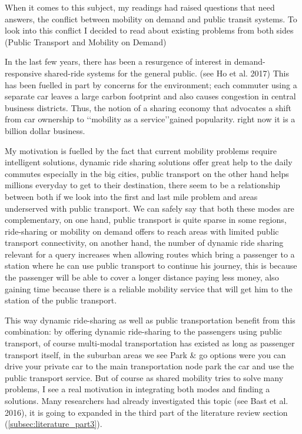 \documentclass{article}
\begin{document}

When it comes to this subject, my readings had raised questions that need answers, the conflict between mobility on demand and public transit systems. To look into this conflict I decided to read about existing problems from both sides (Public Transport and Mobility on Demand)

In the last few years, there has been a resurgence of interest in demand-responsive shared-ride systems for the general public. (see Ho et al. 2017)\cite{HO_darp2018} This has been fuelled in part by concerns for the environment; each commuter using a separate car leaves a large carbon footprint and also causes congestion in central business districts. Thus, the notion of a sharing economy that advocates a shift from car ownership to \lq\lq{mobility as a service}\rq\rq gained popularity. right now it is a billion dollar business. 

My motivation is fuelled by the fact that current mobility problems require intelligent solutions, dynamic ride sharing solutions offer great help to the daily commutes especially in the big cities, public transport on the other hand helps millions everyday to get to their destination,
there seem to be a relationship between both if we look into the first and last mile problem and areas underserved with public transport. We can safely say that both these modes are complementary, on one hand, public transport is quite sparse in some regions, ride-sharing or mobility on demand offers to reach areas with limited public transport connectivity, on another hand, the number of dynamic ride sharing relevant for a query increases when allowing routes which bring a passenger to a station where he can use public transport to continue 
his journey, this is because the passenger will be able to cover a longer distance paying less money, also gaining time because there is a reliable mobility service that will get him to the station of the public transport. \cite{FAHNENSCHREIBER2016176}

This way dynamic ride-sharing as well as public transportation benefit from this combination: by offering dynamic ride-sharing to the passengers using public transport, of course multi-modal transportation has existed as long as passenger transport itself, in the suburban areas we see Park \& go options were you can drive your private car to the main transportation node park the car and use the public transport service. But of course as shared mobility tries to solve many problems, I see a real motivation in integrating both modes and finding a solutions. Many researchers had already investigated this topic (see Bast et al. 2016)\cite{Bast_2016}, it is going to expanded in the third part of the literature review section (\ref{subsec:literature_part3}).
\end{document}
